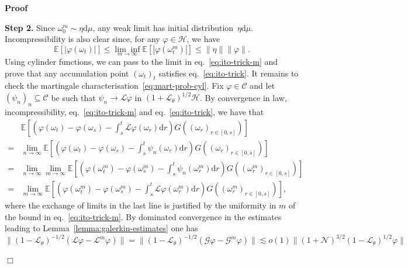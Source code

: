 \documentclass{article}
\newcommand{\mathd}{\mathrm{d}}
\newcommand{\tmtextbf}[1]{{\bfseries{#1}}}
\newenvironment{proof}{\noindent\textbf{Proof\ }}{\hspace*{\fill}$\Box$\medskip}
\begin{document}
\begin{proof}
  \
  
  \tmtextbf{Step 2.} Since $\omega_0^m \sim \eta \mathd \mu$, any weak limit
  has initial distribution~$\eta \mathd \mu$. Incompressibility is also clear
  since, for any $\varphi \in \mathcal{H}$, we have
  \[ \mathbb{E} [| \varphi (\omega_t) |] \leqslant \underset{m \rightarrow
     \infty}{\lim \inf} \mathbb{E} [| \varphi (\omega_t^m) |] \leqslant \|
     \eta \| \| \varphi \| . \]
  Using cylinder functions, we can pass to the limit in
  eq.~{\eqref{eq:ito-trick-m}} and prove that any accumulation point
  $(\omega_t)_t$ satisfies eq.~{\eqref{eq:ito-trick}}. It remains to check the
  martingale characterisation~{\eqref{eq:mart-prob-cyl}}. Fix $\varphi \in
  \mathcal{C}$ and let $(\psi_n)_n \subseteq \mathcal{C}$ be such that $\psi_n
  \rightarrow \mathcal{L} \varphi$ in $(1 +\mathcal{L}_{\theta})^{1 / 2}
  \mathcal{H}$. By convergence in law, incompressibility,
  eq.~{\eqref{eq:ito-trick-m}} and eq.~{\eqref{eq:ito-trick}}, we have that
  \[ \begin{array}{ll}
       & \mathbb{E} \left[ \left( \varphi (\omega_t) - \varphi (\omega_s) -
       \int_s^t \mathcal{L} \varphi (\omega_r) \mathd r \right) G
       ((\omega_r)_{r \in [0, s]}) \right]\\
       = & \lim_{n \rightarrow \infty} \mathbb{E} \left[ \left( \varphi
       (\omega_t) - \varphi (\omega_s) - \int_s^t \psi_n (\omega_r) \mathd r
       \right) G ((\omega_r)_{r \in [0, s]}) \right]\\
       = & \lim_{n \rightarrow \infty} \lim_{m \rightarrow \infty} \mathbb{E}
       \left[ \left( \varphi (\omega_t^m) - \varphi (\omega_s^m) - \int_s^t
       \psi_n (\omega_r^m) \mathd r \right) G ((\omega_r^m)_{r \in [0, s]})
       \right]\\
       = & \lim_{m \rightarrow \infty} \mathbb{E} \left[ \left( \varphi
       (\omega_t^m) - \varphi (\omega_s^m) - \int_s^t \mathcal{L} \varphi
       (\omega_r^m) \mathd r \right) G ((\omega_r^m)_{r \in [0, s]}) \right],
     \end{array} \]
  where the exchange of limits in the last line is justified by the uniformity
  in $m$ of the bound in eq.~{\eqref{eq:ito-trick-m}}. By dominated
  convergence in the estimates leading to Lemma~\ref{lemma:galerkin-estimates}
  one has
  \[ \| (1 -\mathcal{L}_{\theta})^{- 1 / 2} (\mathcal{L} \varphi
     -\mathcal{L}^m \varphi) \| = \| (1 -\mathcal{L}_{\theta})^{- 1 / 2}
     (\mathcal{G} \varphi -\mathcal{G}^m \varphi) \| \lesssim o (1) \| (1
     +\mathcal{N})^{3 / 2} (1 -\mathcal{L}_{\theta})^{1 / 2} \varphi \| \]

\end{proof}
\end{document}
